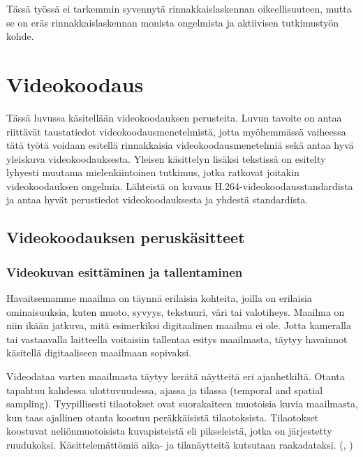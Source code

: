 Tässä työssä ei tarkemmin syvennytä rinnakkaislaskennan oikeellisuuteen, mutta
se on eräs rinnakkaislaskennan monista ongelmista ja aktiivisen tutkimustyön kohde.

\section{Videokoodaus}
\label{chap:coding}

Tässä luvussa käsitellään videokoodauksen perusteita. Luvun tavoite on
antaa riittävät taustatiedot videokoodausmenetelmistä, jotta myöhemmässä
vaiheessa tätä työtä voidaan esitellä rinnakkaisia
videokoodausmenetelmiä sekä antaa hyvä yleiskuva videokoodauksesta. Yleisen
käsittelyn lisäksi tekstissä on esitelty lyhyesti muutama mielenkiintoinen
tutkimus, jotka ratkovat joitakin videokoodauksen ongelmia. Lähteistä
\citealt{h264} on kuvaus H.264-videokoodausstandardista ja antaa hyvät
perustiedot videokoodauksesta ja yhdestä standardista.

\subsection{Videokoodauksen peruskäsitteet}

\subsubsection{Videokuvan esittäminen ja tallentaminen}

Havaitsemamme maailma on täynnä erilaisia kohteita, joilla on
erilaisia ominaisuuksia, kuten muoto, syvyys, tekstuuri, väri tai valotiheys.
Maailma on niin ikään jatkuva, mitä esimerkiksi digitaalinen maailma ei ole. Jotta kameralla tai vastaavalla
laitteella voitaisiin tallentaa esitys maailmasta, täytyy havainnot käsitellä
digitaaliseen maailmaan sopivaksi.

Videodataa varten maailmasta täytyy kerätä näytteitä eri ajanhetkiltä. Otanta
tapahtuu kahdessa ulottuvuudessa, ajassa ja tilassa (temporal and spatial
sampling). Tyypillisesti tilaotokset ovat suorakaiteen muotoisia kuvia
maailmasta, kun taas ajallinen otanta koostuu peräkkäisistä tilaotoksista.
Tilaotokset koostuvat neliönmuotoisista kuvapisteistä eli pikseleistä, jotka
on järjestetty ruudukoksi. Käsittelemättömiä aika- ja
tilanäytteitä kutsutaan raakadataksi. (\citealt{h264}, \citealt{du})

